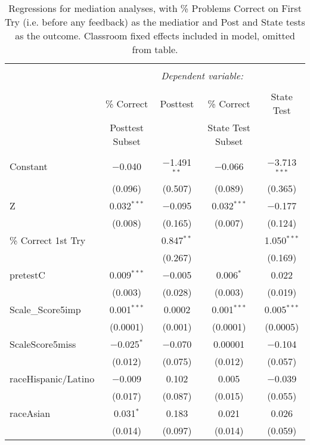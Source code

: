 
\begin{table}[!htbp] \centering 
  \caption{Regressions for mediation analyses, with \% Problems Correct on First Try (i.e. before any feedback) as the mediatior and Post and State tests as the outcome. Classroom fixed effects included in model, omitted from table.} 
  \label{} 
\begin{tabular}{@{\extracolsep{5pt}}lcccc} 
\\[-1.8ex]\hline 
\hline \\[-1.8ex] 
 & \multicolumn{4}{c}{\textit{Dependent variable:}} \\ 
\cline{2-5} 
\\[-1.8ex] & \% Correct & Posttest & \% Correct & State Test \\ 
 & Posttest Subset &  & State Test Subset &  \\ 
\hline \\[-1.8ex] 
 Constant & $-$0.040 & $-$1.491$^{**}$ & $-$0.066 & $-$3.713$^{***}$ \\ 
  & (0.096) & (0.507) & (0.089) & (0.365) \\ 
 Z & 0.032$^{***}$ & $-$0.095 & 0.032$^{***}$ & $-$0.177 \\ 
  & (0.008) & (0.165) & (0.007) & (0.124) \\ 
 \% Correct 1st Try &  & 0.847$^{**}$ &  & 1.050$^{***}$ \\ 
  &  & (0.267) &  & (0.169) \\ 
 pretestC & 0.009$^{***}$ & $-$0.005 & 0.006$^{*}$ & 0.022 \\ 
  & (0.003) & (0.028) & (0.003) & (0.019) \\ 
 Scale\_Score5imp & 0.001$^{***}$ & 0.0002 & 0.001$^{***}$ & 0.005$^{***}$ \\ 
  & (0.0001) & (0.001) & (0.0001) & (0.0005) \\ 
 ScaleScore5miss & $-$0.025$^{*}$ & $-$0.070 & 0.00001 & $-$0.104 \\ 
  & (0.012) & (0.075) & (0.012) & (0.057) \\ 
 raceHispanic/Latino & $-$0.009 & 0.102 & 0.005 & $-$0.039 \\ 
  & (0.017) & (0.087) & (0.015) & (0.055) \\ 
 raceAsian & 0.031$^{*}$ & 0.183 & 0.021 & 0.026 \\ 
  & (0.014) & (0.097) & (0.014) & (0.059) \\ 

\end{tabular}
\end{table}
